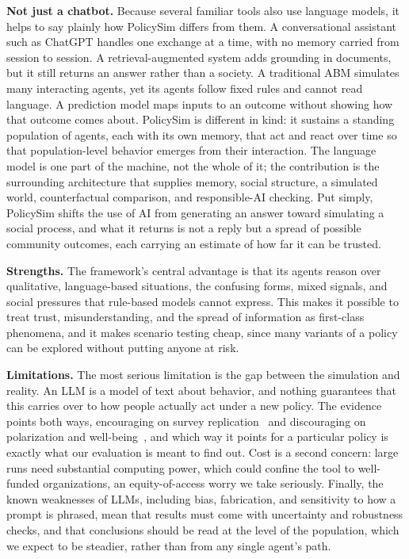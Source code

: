 \documentclass[conference]{IEEEtran}
\begin{document}
\textbf{Not just a chatbot.} Because several familiar tools also use language models, it helps to say plainly how PolicySim differs from them. A conversational assistant such as ChatGPT handles one exchange at a time, with no memory carried from session to session. A retrieval-augmented system adds grounding in documents, but it still returns an answer rather than a society. A traditional ABM simulates many interacting agents, yet its agents follow fixed rules and cannot read language. A prediction model maps inputs to an outcome without showing how that outcome comes about. PolicySim is different in kind: it sustains a standing population of agents, each with its own memory, that act and react over time so that population-level behavior emerges from their interaction. The language model is one part of the machine, not the whole of it; the contribution is the surrounding architecture that supplies memory, social structure, a simulated world, counterfactual comparison, and responsible-AI checking. Put simply, PolicySim shifts the use of AI from generating an answer toward simulating a social process, and what it returns is not a reply but a spread of possible community outcomes, each carrying an estimate of how far it can be trusted.

\textbf{Strengths.} The framework's central advantage is that its agents reason over qualitative, language-based situations, the confusing forms, mixed signals, and social pressures that rule-based models cannot express. This makes it possible to treat trust, misunderstanding, and the spread of information as first-class phenomena, and it makes scenario testing cheap, since many variants of a policy can be explored without putting anyone at risk.

\textbf{Limitations.} The most serious limitation is the gap between the simulation and reality. An LLM is a model of text about behavior, and nothing guarantees that this carries over to how people actually act under a new policy. The evidence points both ways, encouraging on survey replication~\cite{argyle2023,park2024} and discouraging on polarization and well-being~\cite{bisbee2024,pataranutaporn2025}, and which way it points for a particular policy is exactly what our evaluation is meant to find out. Cost is a second concern: large runs need substantial computing power, which could confine the tool to well-funded organizations, an equity-of-access worry we take seriously. Finally, the known weaknesses of LLMs, including bias, fabrication, and sensitivity to how a prompt is phrased, mean that results must come with uncertainty and robustness checks, and that conclusions should be read at the level of the population, which we expect to be steadier, rather than from any single agent's path.
\end{document}
